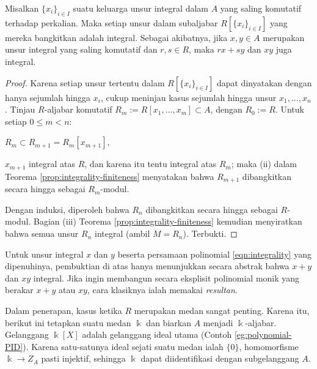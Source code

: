 \begin{corollary}\label{prop:integrality-compositum}
	Misalkan $\{x_i\}_{i \in I}$ suatu keluarga unsur integral dalam $A$ yang saling komutatif terhadap perkalian. Maka setiap unsur dalam subaljabar $R[\{x_i\}_{i \in I}]$ yang mereka bangkitkan adalah integral. Sebagai akibatnya, jika $x, y \in A$ merupakan unsur integral yang saling komutatif dan $r,s \in R$, maka $rx + sy$ dan $xy$ juga integral.
\end{corollary}
\begin{proof}
	Karena setiap unsur tertentu dalam $R[\{x_i\}_{i \in I}]$ dapat dinyatakan dengan hanya sejumlah hingga $x_i$, cukup meninjau kasus sejumlah hingga unsur $x_1, \ldots, x_n$. Tinjau $R$-aljabar komutatif $R_m := R[x_1, \ldots, x_m] \subset A$, dengan $R_0 := R$. Untuk setiap $0 \leq m < n$:
	\begin{compactitem}
		\item $R_m \subset R_{m+1} = R_m[x_{m+1}]$,
		\item $x_{m+1}$ integral atas $R$, dan karena itu tentu integral atas $R_m$; maka (ii) dalam Teorema \ref{prop:integrality-finiteness} menyatakan bahwa $R_{m+1}$ dibangkitkan secara hingga sebagai $R_m$-modul.
	\end{compactitem}
	Dengan induksi, diperoleh bahwa $R_n$ dibangkitkan secara hingga sebagai $R$-modul. Bagian (iii) Teorema \ref{prop:integrality-finiteness} kemudian menyiratkan bahwa semua unsur $R_n$ integral (ambil $M = R_n$). Terbukti.
\end{proof}
\begin{remark}
	Untuk unsur integral $x$ dan $y$ beserta persamaan polinomial \eqref{eqn:integrality} yang dipenuhinya, pembuktian di atas hanya menunjukkan secara abstrak bahwa $x + y$ dan $xy$ integral. Jika ingin membangun secara eksplisit polinomial monik yang berakar $x+y$ atau $xy$, cara klasiknya ialah memakai \emph{resultan}.
\end{remark}

Dalam penerapan, kasus ketika $R$ merupakan medan sangat penting. Karena itu, berikut ini tetapkan suatu medan $\Bbbk$ dan biarkan $A$ menjadi $\Bbbk$-aljabar. Gelanggang $\Bbbk[X]$ adalah gelanggang ideal utama (Contoh \ref{eg:polynomial-PID}). Karena satu-satunya ideal sejati suatu medan ialah $\{0\}$, homomorfisme $\Bbbk \to Z_A$ pasti injektif, sehingga $\Bbbk$ dapat diidentifikasi dengan subgelanggang $A$.

